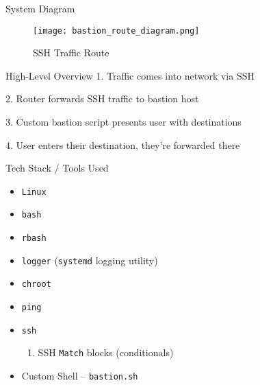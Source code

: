 \documentclass[14pt,compress,dvipsnames,aspectratio=169]{beamer} %
\begin{document}
\begin{frame}{System Diagram}
    \begin{figure}
        \centering
        \texttt{[image: bastion\_route\_diagram.png]}
        \caption{SSH Traffic Route}
    \end{figure}
\end{frame}





\begin{frame}{High-Level Overview}
        1. Traffic comes into network via SSH 
        \vspace{1.15cm}

        2. Router forwards SSH traffic to bastion host
        \vspace{1.15cm}

        3. Custom bastion script presents user with destinations
        \vspace{1.15cm}

        4. User enters their destination, they're forwarded there
\end{frame}


\begin{frame}{Tech Stack / Tools Used}
    \begin{itemize}
        \item{\texttt{Linux}}
        \item{\texttt{bash}}
        \item{\texttt{rbash}}
        \item{\texttt{logger} (\texttt{systemd} logging utility)}
        \item{\texttt{chroot}}
        \item{\texttt{ping}}
        \item{\texttt{ssh}}
            \begin{enumerate}
                \item{SSH \texttt{Match} blocks (conditionals)}
            \end{enumerate}
        \item{Custom Shell -- \texttt{bastion.sh}}
    \end{itemize}
\end{frame}
\end{document}

